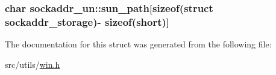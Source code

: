 \subsubsection[{sun\+\_\+path}]{\setlength{\rightskip}{0pt plus 5cm}char sockaddr\+\_\+un\+::sun\+\_\+path\mbox{[}sizeof(struct sockaddr\+\_\+storage)-\/             sizeof(short)\mbox{]}}\hypertarget{structsockaddr__un_a623d9818fff309e9e9a5a80b8bf9e0e0}{}\label{structsockaddr__un_a623d9818fff309e9e9a5a80b8bf9e0e0}


The documentation for this struct was generated from the following file\+:\begin{DoxyCompactItemize}
\item 
src/utils/\hyperlink{win_8h}{win.\+h}\end{DoxyCompactItemize}
